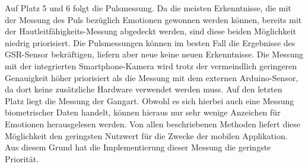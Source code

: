 Auf Platz 5 und 6 folgt die Pulsmessung. Da die meisten Erkenntnisse, die mit der Messung des Puls bezüglich Emotionen gewonnen werden können, bereits mit der Hautleitfähigkeits-Messung abgedeckt werden, sind diese beiden Möglichkeit niedrig priorisiert. Die Pulsmessungen können im besten Fall die Ergebnisse des GSR-Sensor bekräftigen, liefern aber neue keine neuen Erkenntnisse. Die Messung mit der integrierten Smartphone-Kamera wird trotz der vermeindlich geringeren Genauigkeit höher priorisiert als die Messung mit dem externen Arduino-Sensor, da dort keine zusätzliche Hardware verwendet werden muss. \newline
Auf den letzten Platz liegt die Messung der Gangart. Obwohl es sich hierbei auch eine Messung biometrischer Daten handelt, können hieraus nur sehr wenige Anzeichen für Emotionen herausgelesen werden. Von allen beschriebenen Methoden liefert diese Möglichkeit den geringsten Nutzwert für die Zwecke der mobilen Applikation. Aus diesem Grund hat die Implementierung dieser Messung die geringste Priorität. \newline
